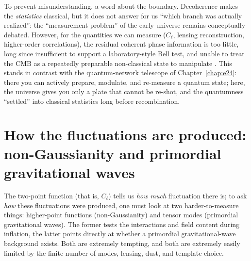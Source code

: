 To prevent misunderstanding, a word about the boundary. Decoherence makes the \emph{statistics} classical, but it does not answer for us ``which branch was actually realized'': the ``measurement problem'' of the early universe remains conceptually debated. However, for the quantities we can measure (\(C_\ell\), lensing reconstruction, higher-order correlations), the residual coherent phase information is too little, long since insufficient to support a laboratory-style Bell test, and unable to treat the CMB as a repeatedly preparable non-classical state to manipulate \citep{1996CQGra..13..377P,2006CQGra..23.2317P}. This stands in contrast with the quantum-network telescope of Chapter~\ref{chap:e24}: there you can actively prepare, modulate, and re-measure a quantum state; here, the universe gives you only a plate that cannot be re-shot, and the quantumness ``settled'' into classical statistics long before recombination.

\section{How the fluctuations are produced: non-Gaussianity and primordial gravitational waves}
\label{sec:e23-tensors}

The two-point function (that is, \(C_\ell\)) tells us \emph{how much} fluctuation there is; to ask \emph{how} these fluctuations were produced, one must look at two harder-to-measure things: higher-point functions (non-Gaussianity) and tensor modes (primordial gravitational waves). The former tests the interactions and field content during inflation, the latter points directly at whether a primordial gravitational-wave background exists. Both are extremely tempting, and both are extremely easily limited by the finite number of modes, lensing, dust, and template choice.

